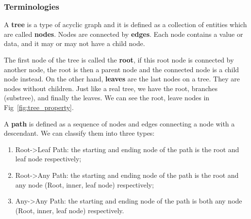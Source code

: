 \documentclass[data-structure.tex]{subfiles}
\begin{document}
\subsubsection{Terminologies}
A \textbf{tree} is a type of acyclic graph and it is defined as a collection of entities which are called \textbf{nodes}. Nodes are connected by \textbf{edges}. Each node contains a value or data, and it may or may not have a child node. 

The first node of the tree is called the \textbf{root}, if this root node is connected by another node, the root is then a parent node and the connected node is a child node instead. On the other hand, \textbf{leaves} are the last nodes on a tree. They are nodes without children. Just like a real tree, we have the root, branches (substree), and finally the leaves. We can see the root, leave nodes in Fig~\ref{fig:tree_property}.  

A \textbf{path} is defined as a sequence of nodes and edges connecting a node with a descendant.  We can classify them into three types: 
\begin{enumerate}
    \item Root->Leaf Path: the starting and ending node of the path is the root and leaf node respectively;
    \item Root->Any Path: the starting and ending node of the path is the root and any node (Root, inner, leaf node) respectively;
    \item Any->Any Path: the starting and ending node of the path is both any node (Root, inner, leaf node) respectively. 
\end{enumerate}
\end{document}
